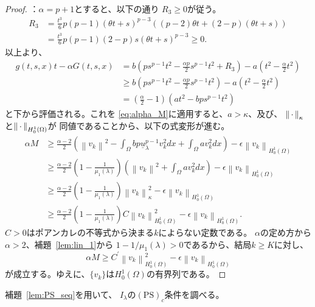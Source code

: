 \begin{proof}
 ：$\alpha = p + 1$とすると、以下の通り
 $R_3 \geq 0$が従う。
 \begin{align*}
  R_3 &= \frac{t^3}{6} p(p-1)(\theta t + s)^{p-3} \left( (p-2)\theta t
  + (2-p) (\theta t + s)\right) \\
  &= \frac{t^3}{6}p(p-1)(2-p) s (\theta t + s)^{p-3} \geq 0.
 \end{align*}
 以上より、
 \begin{align*}
  g(t, s, x)t - \alpha G(t, s, x) &= b\left( ps^{p-1}t^2 -
  \frac{\alpha p}{2} s^{p-1} t^2 + R_3 \right) - a \left( t^2 -
  \frac{\alpha}{2} t^2 \right) \\
  & \geq b\left( ps^{p-1}t^2 -
  \frac{\alpha p}{2} s^{p-1} t^2 \right) - a \left( t^2 -
  \frac{\alpha}{2} t^2 \right) \\
  & = \left( \frac{\alpha}{2} - 1 \right) \left( at^2 - bps^{p-1} t^2 \right)
 \end{align*}
 と下から評価される。これを
 \eqref{eq:alpha_M}に適用すると、$a >
 \kappa$、及び、
 $\left\|\, \cdot \, \right\|_\kappa$と$\left\|\, \cdot \, \right\|_{H_0^1(\Omega)}$が
 同値であることから、以下の式変形が進む。
 \begin{align*}
  \alpha M &\geq \frac{\alpha-2}{2} \left( \left\| v_k \right\|^2 -
  \int_\Omega bp \underline{u}_\lambda^{p-1} v_k^2 dx + \int_\Omega
  av_k^2 dx \right) - \epsilon \left\| v_k \right\|_{H_0^1(\Omega)} \\
  & \geq \frac{\alpha -2}{2} \left( 1 - \frac{1}{\mu_1(\lambda)} \right)
  \left( \left\| v_k \right\|^2 + \int_\Omega av_k^2 dx \right)
  - \epsilon \left\|
  v_k \right\|_{H_0^1(\Omega)} \\
  & \geq \frac{\alpha -2}{2} \left( 1 - \frac{1}{\mu_1(\lambda)}
  \right) \left\| v_k \right\|_\kappa^2
  - \epsilon \left\|
  v_k \right\|_{H_0^1(\Omega)} \\
  & \geq  \frac{\alpha -2}{2} \left( 1 - \frac{1}{\mu_1(\lambda)}
  \right) C \left\| v_k \right\|_{H_0^1(\Omega)}^2 - \epsilon \left\|
  v_k \right\|_{H_0^1(\Omega)}.
 \end{align*}
 $C >0$はポアンカレの不等式から決まる$k$によらない定数である。
 $\alpha$の定め方から$\alpha > 2$、補題~\ref{lem:lin_1}から
 $1 - 1/\mu_1(\lambda) > 0$であるから、結局$k \geq K$に対し、
 \[
  \alpha M \geq C^\prime \left\| v_k \right\|_{H_0^1(\Omega)}^2 - \epsilon
 \left\| v_k \right\|_{H_0^1(\Omega)}
 \]
 が成立する。ゆえに、$\{ v_k \}$は$H_0^1(\Omega)$の有界列である。 \qedhere
\end{proof}

補題~\ref{lem:PS_seq}を用いて、
$I_\lambda$の$(\mathrm{PS})_c$条件を調べる。

